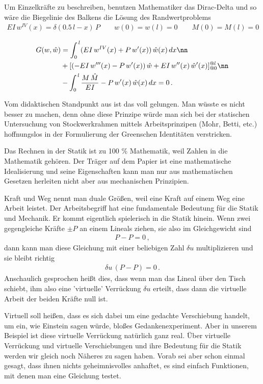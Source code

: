 Um Einzelkr\"{a}fte zu beschreiben, benutzen Mathematiker das Dirac-Delta und so w\"{a}re die Biegelinie des Balkens die L\"{o}sung des Randwertproblems
\begin{align}
EI\,w^{IV}(x) = \delta( 0.5\,l - x)\,P \qquad w(0) = w(l) = 0 \qquad M(0) = M(l) = 0
\end{align}

\begin{align}
G(w,\hat{w}) &= \int_0^{\,l} (EI\,w^{IV}(x) + P\,w'(x))\,\hat{w}(x)\,dx \nn \\
&+ [(- EI\,w'''(x) - P\,w'(x))\,\hat{w} + EI\,w''(x)\,\hat{w}'(x)]_{@0}^{@l}\nn \\
&- \int_0^{\,l} \frac{M\,\hat{M}}{EI} - P\,w'(x)\,\hat{w}(x)\,dx = 0\,.
\end{align}

Vom didaktischen Standpunkt aus ist das voll gelungen. Man w\"{u}sste es nicht besser zu machen, denn ohne diese Prinzipe w\"{u}rde man sich bei der statischen Untersuchung von Stockwerkrahmen mittels Arbeitsprinzipen (Mohr, Betti, etc.) hoffnungslos in der Formulierung der Greenschen Identit\"{a}ten verstricken.

Das Rechnen in der Statik ist zu 100 \% Mathematik, weil Zahlen in die Mathematik geh\"{o}ren. Der Tr\"{a}ger auf dem Papier ist eine mathematische Idealisierung und seine Eigenschaften kann man nur aus mathematischen Gesetzen herleiten nicht aber aus mechanischen Prinzipien.

Kraft und Weg nennt man duale Gr\"{o}{\ss}en, weil eine Kraft auf einem Weg eine Arbeit leistet. Der Arbeitsbegriff hat eine fundamentale Bedeutung f\"{u}r die Statik und Mechanik. Er kommt eigentlich spielerisch in die Statik hinein. Wenn zwei gegengleiche Kr\"{a}fte $\pm P$ an einem Lineals ziehen, sie also im Gleichgewicht sind
\begin{align}
P - P = 0\,,
\end{align}
dann kann man diese Gleichung mit einer beliebigen Zahl $ \delta u $ multiplizieren und sie bleibt richtig
\begin{align}
\delta u \,(P - P) = 0\,.
\end{align}
Anschaulich gesprochen hei{\ss}t dies, dass wenn man das Lineal \"{u}ber den Tisch schiebt, ihm also eine 'virtuelle' Verr\"{u}ckung $ \delta u $ erteilt, dass dann die virtuelle Arbeit der beiden Kr\"{a}fte null ist.

Virtuell soll hei{\ss}en, dass es sich dabei um eine gedachte Verschiebung handelt, um ein, wie Einstein sagen w\"{u}rde, blo{\ss}es Gedankenexperiment. Aber in unserem Beispiel ist diese virtuelle Verr\"{u}ckung nat\"{u}rlich ganz real.  \"{U}ber virtuelle Verr\"{u}ckung und virtuelle Verschiebungen und ihre Bedeutung f\"{u}r die Statik werden wir gleich noch N\"{a}heres zu sagen haben. Vorab sei aber schon einmal gesagt, dass ihnen nichts geheimnisvolles anhaftet, es sind einfach Funktionen, mit denen man eine Gleichung testet.

